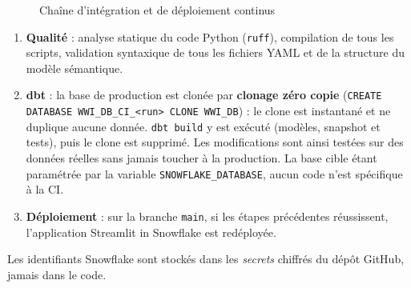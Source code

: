 \begin{figure}[H]
\centering
{}
\caption{Chaîne d'intégration et de déploiement continus}
\label{fig:ci}
\end{figure}

\begin{enumerate}
  \item \textbf{Qualité} : analyse statique du code Python (\texttt{ruff}), compilation de tous les
        scripts, validation syntaxique de tous les fichiers YAML et de la structure du modèle sémantique.
  \item \textbf{dbt} : la base de production est clonée par \textbf{clonage zéro copie}
        (\texttt{CREATE DATABASE WWI\_DB\_CI\_<run> CLONE WWI\_DB}) : le clone est instantané et ne
        duplique aucune donnée. \texttt{dbt build} y est exécuté (modèles, snapshot et tests), puis le
        clone est supprimé. Les modifications sont ainsi testées sur des données réelles sans jamais
        toucher à la production. La base cible étant paramétrée par la variable
        \texttt{SNOWFLAKE\_DATABASE}, aucun code n'est spécifique à la CI.
  \item \textbf{Déploiement} : sur la branche \texttt{main}, si les étapes précédentes réussissent,
        l'application Streamlit in Snowflake est redéployée.
\end{enumerate}

Les identifiants Snowflake sont stockés dans les \emph{secrets} chiffrés du dépôt GitHub, jamais dans
le code.
